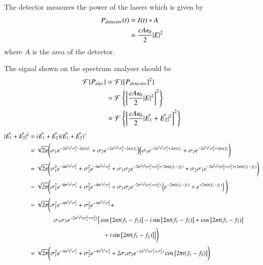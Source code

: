 The detector measures the power of the lasers which is given by
\begin{align}
P_{detector}(t) &= I(t) * A\notag\\
&= \frac{cA\epsilon_0}{2}|E|^2
\end{align}
where $A$ is the area of the detector.

The signal shown on the spectrum analyser should be
\begin{align}
\mathcal{F}\{P_{elec}\} &\propto \mathcal{F}\{\left[P_{detector}\right]^2\}\notag\\
&= \mathcal{F}\left\{\left[\frac{cA\epsilon_0}{2}|E|^2\right]^2\right\}\notag\\
&= \mathcal{F}\left\{\left[\frac{cA\epsilon_0}{2}|\vec{E_1}+\vec{E_2}|^2\right]^2\right\}
\end{align}
\begin{align}
|\vec{E_1}+\vec{E_2}|^2 &= (\vec{E_1}+\vec{E_2})(\vec{E_1}+\vec{E_2})^*\notag\\
&= \sqrt{2\pi} \Bigg(\sigma_1 e^{-2\pi^2t^2\sigma_1^2-2\pi i t f_1} + \sigma_2 e^{-2\pi^2t^2\sigma_2^2-2\pi i t f_2}\Big)\Big(\sigma_1 e^{-2\pi^2t^2\sigma_1^2+2\pi i t f_1} + \sigma_2 e^{-2\pi^2t^2\sigma_2^2+2\pi i t f_2}\Bigg)\notag\\
&= \sqrt{2\pi}\Bigg(\sigma_1^2 e^{-4\pi^2t^2\sigma_1^2} + \sigma_2^2 e^{-4\pi^2t^2\sigma_2^2} + \sigma_1\sigma_2 e^{-2\pi^2t^2(\sigma_1^2+\sigma_2^2)-2\pi i t (f_1-f_2)} + \sigma_2\sigma_1 e^{-2\pi^2t^2(\sigma_2^2+\sigma_1^2)+2\pi i t (f_1-f_2)} \Bigg)\notag\\
&= \sqrt{2\pi}\Bigg(\sigma_1^2 e^{-4\pi^2t^2\sigma_1^2} + \sigma_2^2 e^{-4\pi^2t^2\sigma_2^2} + \sigma_1\sigma_2 e^{-2\pi^2t^2(\sigma_1^2+\sigma_2^2)}\left\{e^{-2\pi i t (f_1-f_2)} + e^{+2\pi i t (f_1-f_2)} \right\}\Bigg)\notag\\
&= \sqrt{2\pi}\Bigg(\sigma_1^2 e^{-4\pi^2t^2\sigma_1^2} + \sigma_2^2 e^{-4\pi^2t^2\sigma_2^2} + \notag\\&\quad\quad\quad\quad\sigma_1\sigma_2 e^{-2\pi^2t^2(\sigma_1^2+\sigma_2^2)}\Big\{\cos\big[2\pi t (f_1-f_2)\big]-i\sin\big[2\pi t (f_1-f_2)\big] + \cos\big[2\pi t (f_1-f_2)\big]\notag\\
& \quad\quad\quad\quad\quad\quad\quad\quad\quad\quad\quad\quad+i\sin\big[2\pi t (f_1-f_2)\big]\Big\} \Bigg)\notag\\
&= \sqrt{2\pi}\Bigg(\sigma_1^2 e^{-4\pi^2t^2\sigma_1^2} + \sigma_2^2 e^{-4\pi^2t^2\sigma_2^2} + 2\sigma_1\sigma_2 e^{-2\pi^2t^2(\sigma_1^2+\sigma_2^2)}\cos\big[2\pi t (f_1-f_2)\big] \Bigg)
\end{align}
